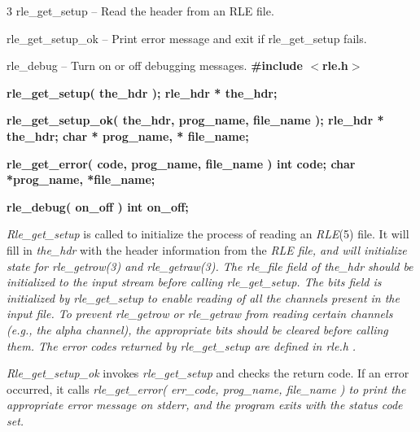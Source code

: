 %
%
%
 3
rle\_get\_setup -- Read the header from an RLE file.
\begin{TPlist}{rle\_get\_setup\_ok -- Print error message and exit if rle\_get\_setup fails.}
\item[{rle\_get\_setup\_ok -- Print error message and exit if rle\_get\_setup fails.}]
\item[{rle\_get\_error -- Print error message for rle\_get\_setup failure.}]
\end{TPlist}\par\noindent
rle\_debug -- Turn on or off debugging messages.
\bf
\#include $<$rle.h$>$
\par\vspace{1.0\baselineskip}
\bf
rle\_get\_setup( the\_hdr );
\nwl
\bf
rle\_hdr * the\_hdr;
\par\vspace{1.0\baselineskip}
\bf
rle\_get\_setup\_ok( the\_hdr, prog\_name, file\_name );
\nwl
\bf
rle\_hdr * the\_hdr;
\nwl
\bf
char * prog\_name, * file\_name;
\par\vspace{1.0\baselineskip}
\bf
rle\_get\_error( code, prog\_name, file\_name )
\nwl
\bf
int code;
\nwl
\bf
char *prog\_name, *file\_name;
\par\vspace{1.0\baselineskip}
\bf
rle\_debug( on\_off )
\nwl
{\bf int} on\_off;
\par
{\it Rle\_get\_setup}
is called to initialize the process of reading an 
{\it RLE}{\rm (5)}
file.
It will fill in
{\it the\_hdr}
with the header information from the %
\it RLE \rm%
file, and will initialize
state for
{\it rle\_getrow}{\rm (3)}
and
{\it rle\_getraw}{\rm (3).}
The
{\it rle\_file}
field of
{\it the\_hdr}
should be initialized to the input stream before calling
{\it rle\_get\_setup}{\rm .}
The
{\it bits}
field is initialized by
{\it rle\_get\_setup}
to enable reading of all the channels present in the input file.  To
prevent %
\it rle\_getrow \rm%
or %
\it rle\_getraw \rm%
from reading certain
channels (e.g., the alpha channel), the appropriate bits should be
cleared before calling them.  The error codes returned by
%
\it rle\_get\_setup \rm%
are defined in %
\it rle.h\rm%
.

{\it Rle\_get\_setup\_ok}
invokes
{\it rle\_get\_setup}
and checks the return code.  If an error occurred, it calls
\it
rle\_get\_error( err\_code, prog\_name, file\_name )
to print the appropriate error message
on
{\it stderr}{\rm ,}
and the program exits with the status code set.

